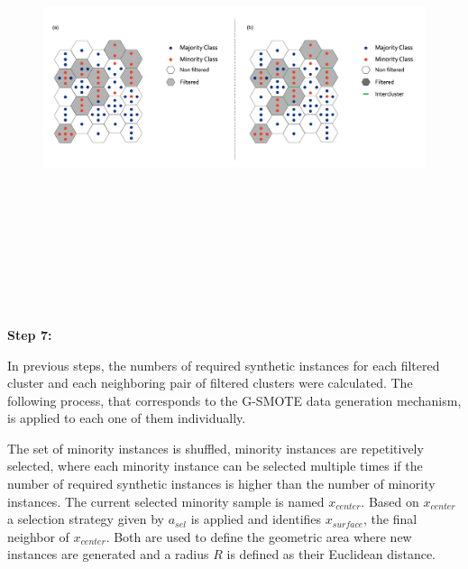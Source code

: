 \documentclass[parskip=full]{scrartcl}
\begin{document}
\begin{figure}[H]
	\centering
	\includegraphics[width=18cm,height=13cm, keepaspectratio]{../../analysis/gsomo/fig5.png}
	\label{fig:Somo_Overview}
\end{figure}

\textbf{Step 7:}

In previous steps, the numbers of required synthetic instances for each filtered cluster and each neighboring pair of filtered clusters were calculated. The following process, that corresponds to the G-SMOTE data generation mechanism, is applied to each one of them individually.

The set of minority instances is shuffled, minority instances are repetitively selected, where each minority instance can be selected multiple times if the number of required synthetic instances is higher than the number of minority instances. The current selected minority sample is named $x_{center}$. Based on $x_{center}$ a selection strategy given by $a_{sel}$ is applied and identifies $x_{surface}$, the final neighbor of $x_{center}$. Both are used to define the geometric area where new instances are generated and a radius $R$ is defined as their Euclidean distance.
\end{document}
